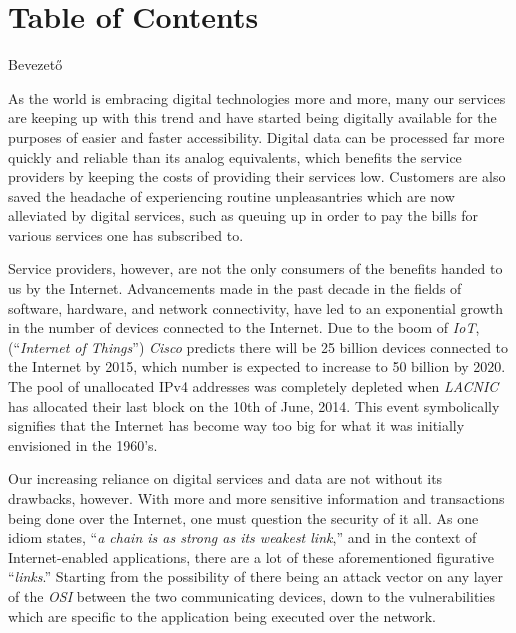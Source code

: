 \documentclass[a4paper,12pt]{article}
\begin{document}
\newpage
\pagestyle{empty}
\section*{Table of Contents}

	\begingroup
	\renewcommand{\section}[2]{}
	\hypersetup{linkcolor=lightblue}
	\setlength{\parskip}{0em}
	\tableofcontents
	\endgroup

	\begingroup
	\hypersetup{linkcolor=lightblue}
	\listoffigures
	\listoftables
	\listoflistings
	\endgroup

\newpage
\pagestyle{fancy}
\section{Introduction}
\sectionhu{Bevezető} 

	As the world is embracing digital technologies more and more, many our services are keeping up with this trend and have started being digitally available for the purposes of easier and faster accessibility. Digital data can be processed far more quickly and reliable than its analog equivalents, which benefits the service providers by keeping the costs of providing their services low. Customers are also saved the headache of experiencing routine unpleasantries which are now alleviated by digital services, such as queuing up in order to pay the bills for various services one has subscribed to.
	
	Service providers, however, are not the only consumers of the benefits handed to us by the Internet. Advancements made in the past decade in the fields of software, hardware, and network connectivity, have led to an exponential growth in the number of devices connected to the Internet. Due to the boom of \textit{IoT}, (``\textit{Internet of Things}'') \textit{Cisco} predicts there will be 25 billion devices connected to the Internet by 2015, which number is expected to increase to 50 billion by 2020.\cite{devans11} The pool of unallocated IPv4 addresses was completely depleted when \textit{LACNIC} has allocated their last block on the 10th of June, 2014.\cite{ghouston11} This event symbolically signifies that the Internet has become way too big for what it was initially envisioned in the 1960's.
	
	Our increasing reliance on digital services and data are not without its drawbacks, however. With more and more sensitive information and transactions being done over the Internet, one must question the security of it all. As one idiom states, ``\textit{a chain is as strong as its weakest link},'' and in the context of Internet-enabled applications, there are a lot of these aforementioned figurative ``\textit{links}.'' Starting from the possibility of there being an attack vector on any layer of the \textit{OSI} between the two communicating devices, down to the vulnerabilities which are specific to the application being executed over the network.
	
\end{document}
